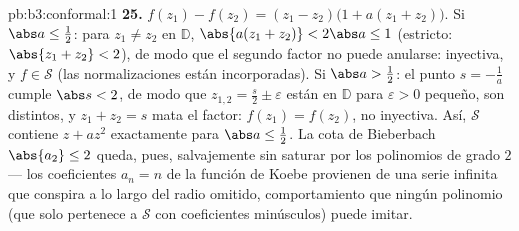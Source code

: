 \begin{solution}{pb:b3:conformal:1}
\textbf{25.} $f(z_1) - f(z_2) = (z_1 - z_2)\bigl(1 + a(z_1 +
z_2)\bigr)$. Si $\abs a \leq \frac12$: para $z_1 \neq z_2$ en
$\mathbb D$, $\abs{a(z_1 + z_2)} < 2\abs a \leq 1$ (estricto:
$\abs{z_1 + z_2} < 2$), de modo que el segundo factor no puede anularse:
inyectiva, y $f \in \mathcal S$ (las normalizaciones están
incorporadas). Si $\abs a > \frac12$: el punto $s =
-\frac1a$ cumple $\abs s < 2$, de modo que $z_{1,2} = \frac s2 \pm
\varepsilon$ están en $\mathbb D$ para $\varepsilon > 0$ pequeño, son
distintos, y $z_1 + z_2 = s$ mata el factor: $f(z_1)
= f(z_2)$, no inyectiva. Así, $\mathcal S$ contiene $z +
az^2$ exactamente para $\abs a \leq \frac12$. La cota de Bieberbach
$\abs{a_2} \leq 2$ queda, pues, salvajemente sin saturar por los
polinomios de grado $2$ --- los coeficientes $a_n = n$ de la función de
Koebe provienen de una serie infinita que conspira a lo largo del radio
omitido, comportamiento que ningún polinomio (que solo pertenece a
$\mathcal S$ con coeficientes minúsculos) puede imitar.
\end{solution}
